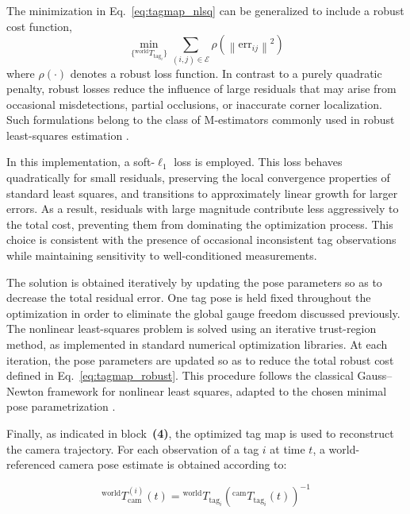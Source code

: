 \documentclass[a4paper,11pt]{article}
\begin{document}
The minimization in Eq.~\eqref{eq:tagmap_nlsq} can be generalized to include a robust cost function,
\begin{equation}
	\min_{\{{}^{\text{world}}\!T_{\text{tag}_i}\}}
	\sum_{(i,j)\in \mathcal{E}}
	\rho\!\left(\left\|\mathrm{err}_{ij}\right\|^2\right)
	\label{eq:tagmap_robust}
\end{equation}
where $\rho(\cdot)$ denotes a robust loss function. In contrast to a purely quadratic penalty, robust losses reduce the influence of large residuals that may arise from occasional misdetections, partial occlusions, or inaccurate corner localization. Such formulations belong to the class of M-estimators commonly used in robust least-squares estimation \cite{huber1964robust}.

In this implementation, a soft-$\ell_1$ loss is employed. This loss behaves quadratically for small residuals, preserving the local convergence properties of standard least squares, and transitions to approximately linear growth for larger errors. As a result, residuals with large magnitude contribute less aggressively to the total cost, preventing them from dominating the optimization process. This choice is consistent with the presence of occasional inconsistent tag observations while maintaining sensitivity to well-conditioned measurements.

The solution is obtained iteratively by updating the pose parameters so as to decrease the total residual error. One tag pose is held fixed throughout the optimization in order to eliminate the global gauge freedom discussed previously. The nonlinear least-squares problem is solved using an iterative trust-region method, as implemented in standard numerical optimization libraries. At each iteration, the pose parameters are updated so as to reduce the total robust cost defined in Eq.~\eqref{eq:tagmap_robust}. This procedure follows the classical Gauss–Newton framework for nonlinear least squares, adapted to the chosen minimal pose parametrization \cite{triggs1999ba}.

Finally, as indicated in block~\textbf{(4)}, the optimized tag map is used to reconstruct the camera trajectory. For each observation of a tag $i$ at time $t$, a world-referenced camera pose estimate is obtained according to:

\begin{equation}
	{}^{\text{world}}\!T_{\text{cam}}^{(i)}(t)
	=
	{}^{\text{world}}\!T_{\text{tag}_i}
	\left({}^{\text{cam}}\!T_{\text{tag}_i}(t)\right)^{-1}
	\label{eq:world_cam_from_mapi}
\end{equation}
\end{document}
